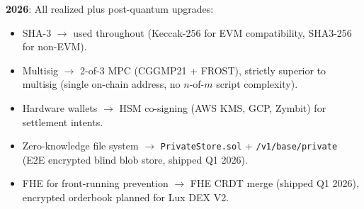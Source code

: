 \textbf{2026}: All realized plus post-quantum upgrades:
\begin{itemize}[nosep]
  \item SHA-3 $\rightarrow$ used throughout (Keccak-256 for
        EVM compatibility, SHA3-256 for non-EVM).
  \item Multisig $\rightarrow$ 2-of-3 MPC
        (CGGMP21 + FROST), strictly superior to multisig
        (single on-chain address, no $n$-of-$m$ script
        complexity).
  \item Hardware wallets $\rightarrow$ HSM co-signing
        (AWS KMS, GCP, Zymbit) for settlement intents.
  \item Zero-knowledge file system $\rightarrow$
        \texttt{PrivateStore.sol} + \texttt{/v1/base/private}
        (E2E encrypted blind blob store, shipped Q1 2026).
  \item FHE for front-running prevention $\rightarrow$ FHE
        CRDT merge (shipped Q1 2026), encrypted orderbook
        planned for Lux DEX V2.
\end{itemize}

